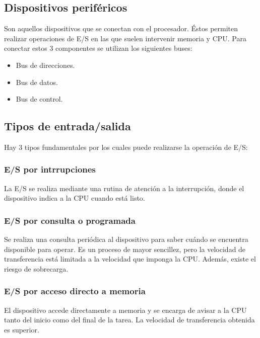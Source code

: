 \documentclass[a4paper, 11pt, titlepage]{article}
\begin{document}
    \subsection{Dispositivos periféricos}

        Son aquellos dispositivos que se conectan con el procesador. Éstos permiten realizar operaciones 
        de E/S en las que suelen intervenir memoria y CPU. Para conectar estos 3 componentes se utilizan 
        los siguientes buses:

        \begin{itemize}
            \item Bus de direcciones.
            \item Bus de datos.
            \item Bus de control.
        \end{itemize}

    \subsection{Tipos de entrada/salida}

        Hay 3 tipos fundamentales por los cuales puede realizarse la operación de E/S:

        \subsubsection{E/S por intrrupciones}

            La E/S se realiza mediante una rutina de atención a la interrupción, donde el dispositivo 
            indica a la CPU cuando está listo.

        \subsubsection{E/S por consulta o programada}

            Se realiza una consulta periódica al dispositivo para saber cuándo se encuentra disponible 
            para operar. Es un proceso de mayor sencillez, pero la velocidad de transferencia está limitada 
            a la velocidad que imponga la CPU. Además, existe el riesgo de sobrecarga.

        \subsubsection{E/S por acceso directo a memoria}

            El dispositivo accede directamente a memoria y se encarga de avisar a la CPU tanto del inicio 
            como del final de la tarea. La velocidad de transferencia obtenida es superior.
\end{document}
